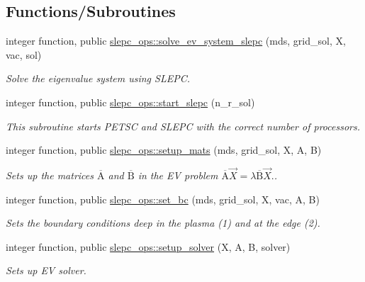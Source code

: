 \subsection*{Functions/\+Subroutines}
\begin{DoxyCompactItemize}
\item 
integer function, public \hyperlink{namespaceslepc__ops_a79c420987056c225931b51c8d30ece1f}{slepc\+\_\+ops\+::solve\+\_\+ev\+\_\+system\+\_\+slepc} (mds, grid\+\_\+sol, X, vac, sol)
\begin{DoxyCompactList}\small\item\em Solve the eigenvalue system using S\+L\+E\+PC. \end{DoxyCompactList}\item 
integer function, public \hyperlink{namespaceslepc__ops_a9cec5d9e8abc41d0d7ffb14352112040}{slepc\+\_\+ops\+::start\+\_\+slepc} (n\+\_\+r\+\_\+sol)
\begin{DoxyCompactList}\small\item\em This subroutine starts P\+E\+T\+SC and S\+L\+E\+PC with the correct number of processors. \end{DoxyCompactList}\item 
integer function, public \hyperlink{namespaceslepc__ops_aac8202cb74cbb06013eb73f1fa0c3118}{slepc\+\_\+ops\+::setup\+\_\+mats} (mds, grid\+\_\+sol, X, A, B)
\begin{DoxyCompactList}\small\item\em Sets up the matrices $\overline{\text{A}}$ and $\overline{\text{B}}$ in the EV problem $ \overline{\text{A}} \vec{X} = \lambda \overline{\text{B}} \vec{X}. $. \end{DoxyCompactList}\item 
integer function, public \hyperlink{namespaceslepc__ops_a05f8a23335ed47ad1996cddf3bcfdc2e}{slepc\+\_\+ops\+::set\+\_\+bc} (mds, grid\+\_\+sol, X, vac, A, B)
\begin{DoxyCompactList}\small\item\em Sets the boundary conditions deep in the plasma (1) and at the edge (2). \end{DoxyCompactList}\item 
integer function, public \hyperlink{namespaceslepc__ops_af2eb258cbc9d353b95fa71d38570afad}{slepc\+\_\+ops\+::setup\+\_\+solver} (X, A, B, solver)
\begin{DoxyCompactList}\small\item\em Sets up EV solver. \end{DoxyCompactList}\item 

\end{DoxyCompactItemize}
